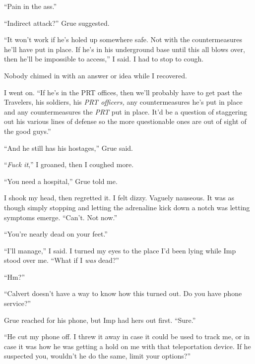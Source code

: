 ``Pain in the ass.''



``Indirect attack?''  Grue suggested.



``It won't work if he's holed up somewhere safe.  Not with the countermeasures he'll have put in place.  If he's in his underground base until this all blows over, then he'll be impossible to access,'' I said.  I had to stop to cough.



Nobody chimed in with an answer or idea while I recovered.



I went on.  ``If he's in the PRT offices, then we'll probably have to get past the Travelers, his soldiers, his \emph{PRT officers, }any countermeasures he's put in place and any countermeasures the \emph{PRT} put in place.  It'd be a question of staggering out his various lines of defense so the more questionable ones are out of sight of the good guys.''



``And he still has his hostages,'' Grue said.



``\emph{Fuck it},'' I groaned, then I coughed more.



``You need a hospital,'' Grue told me.



I shook my head, then regretted it.  I felt dizzy.  Vaguely nauseous.  It was as though simply stopping and letting the adrenaline kick down a notch was letting symptoms emerge.  ``Can't.  Not now.''



``You're nearly dead on your feet.''



``I'll manage,'' I said.  I turned my eyes to the place I'd been lying while Imp stood over me.  ``What if I \emph{was} dead?''



``Hm?''



``Calvert doesn't have a way to know how this turned out.  Do you have phone service?''



Grue reached for his phone, but Imp had hers out first.  ``Sure.''



``He cut my phone off.  I threw it away in case it could be used to track me, or in case it was how he was getting a hold on me with that teleportation device.  If he suspected you, wouldn't he do the same, limit your options?''



